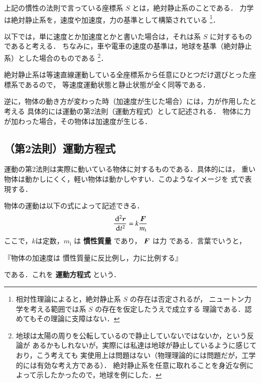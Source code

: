                 上記の慣性の法則で言っている座標系 $S$ とは，絶対静止系のことである．
                力学は絶対静止系を，速度や加速度，力の基準として構築されている
                    \footnote{相対性理論によると，絶対静止系 $S$ の存在は否定されるが，
                        ニュートン力学を考える範囲では系 $S$ の存在を仮定したうえで成立する
                        理論である．認めてもその理論に支障はない．
                    }．

                以下では，単に速度とか加速度とかと書いた場合は，それは系 $S$ に対するもの
                であると考える．
                ちなみに，車や電車の速度の基準は，地球を基準（絶対静止系）とした場合のものである
                  \footnote{
                    地球は太陽の周りを公転しているので静止していないではないか，という反論が
                    あるかもしれないが，実際には私達は地球が静止しているように感じており，こう考えても
                    実使用上は問題はない（物理理論的には問題だが，工学的には有効な考え方である）．
                    絶対静止系を任意に取れることを身近な例によって示したかったので，地球を例にした．
                  }．

                絶対静止系は等速直線運動している全座標系から任意にひとつだけ選びとった座標系であるので，
                等速度運動状態と静止状態が全く同等である．

                逆に，物体の動き方が変わった時（加速度が生じた場合）には，力が作用したと考える
                具体的には運動の第2法則（運動方程式）として記述される．
                物体に力が加わった場合，その物体は加速度が生じる．

        \subsection{（第2法則）運動方程式}
                運動の第2法則は実際に動いている物体に対するものである．具体的には，
                重い物体は動かしにくく，軽い物体は動かしやすい．このようなイメージを
                式で表現する．

                物体の運動は以下の式によって記述できる．
                    \begin{align}\label{undouhouteisiki}
                        \frac{\df^{2}\br}{\df t^{2}} = k\frac{\bF}{m_{\mathrm{i}}}
                    \end{align}
                ここで，$k$は定数，$m_{\mathrm{i}}$ は \textbf{慣性質量} であり，
                $\boldsymbol{F}$ は力 である．言葉でいうと，
                    \begin{center}
                『物体の加速度は 慣性質量に反比例し，力に比例する』
                    \end{center}
                である．これを \textbf{運動方程式} という．

